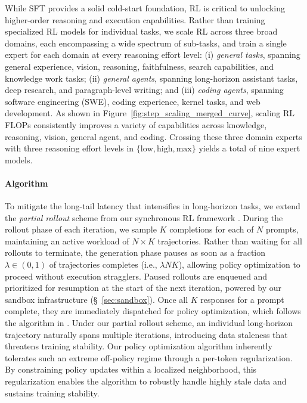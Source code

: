 While SFT provides a solid cold-start foundation, RL is critical to unlocking higher-order reasoning and execution capabilities. 
Rather than training specialized RL models for individual tasks, we scale RL across three broad domains, each encompassing a wide spectrum of sub-tasks, and train a single expert for each domain at every reasoning effort level:
(i) \emph{general tasks}, spanning general experience, vision, reasoning, faithfulness, search capabilities, and knowledge work tasks; 
(ii) \emph{general agents}, spanning long-horizon assistant tasks, deep research, and paragraph-level writing; and 
(iii) \emph{coding agents}, spanning software engineering (SWE), coding experience, kernel tasks, and web development. 
As shown in Figure~\ref{fig:step_scaling_merged_curve}, 
scaling RL FLOPs consistently improves a variety of capabilities across knowledge, reasoning, vision, general agent, and coding. 
Crossing these three domain experts with three reasoning effort levels in $\{\text{low}, \text{high}, \text{max}\}$ yields a total of nine expert models.


\paragraph{Algorithm}

To mitigate the long-tail latency that intensifies in long-horizon tasks, we extend the \emph{partial rollout} scheme from our synchronous RL framework \citep{kimik15,kimik25}. 
During the rollout phase of each iteration, we sample $K$ completions for each of $N$ prompts, maintaining an active workload of $N \times K$ trajectories. Rather than waiting for all rollouts to terminate, the generation phase pauses as soon as a fraction $\lambda \in (0, 1)$ of trajectories completes (i.e., $\lambda NK$), allowing policy optimization to proceed without execution stragglers. Paused rollouts are enqueued and prioritized for resumption at the start of the next iteration, powered by our sandbox infrastructure (\S~\ref{sec:sandbox}). 
Once all $K$ responses for a prompt complete, they are immediately dispatched for policy optimization, which follows the algorithm in  \citep{kimik25}. 
Under our partial rollout scheme, an individual long-horizon trajectory naturally spans multiple iterations, introducing data staleness that threatens training stability. 
Our policy optimization algorithm inherently tolerates such an extreme off-policy regime through a per-token regularization.  By constraining policy updates within a localized neighborhood, this regularization enables the algorithm to robustly handle highly stale data and sustains training stability.



